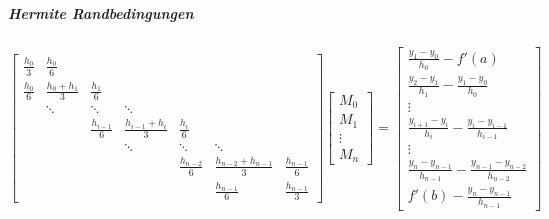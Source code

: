 			\subparagraph{Hermite Randbedingungen}
				\begin{equation*}
					\begin{bmatrix}
						\frac{h_0}{3} & \frac{h_0}{6}       &                                                                                                                   \\
						\frac{h_0}{6} & \frac{h_0 + h_1}{3} & \frac{h_1}{6}       &                                                                                             \\
						              & \ddots              & \ddots              & \ddots                  &                                                                   \\
						              &                     & \frac{h_{i - 1}}{6} & \frac{h_{i-1} + h_i}{3} & \frac{h_i}{6}     &                                               \\
						              &                     &                     & \ddots                  & \ddots            & \ddots                    &                   \\
						              &                     &                     &                         & \frac{h_{n-2}}{6} & \frac{h_{n-2}+h_{n-1}}{3} & \frac{h_{n-1}}{6} \\
						              &                     &                     &                         &                   & \frac{h_{n-1}}{6}         & \frac{h_{n-1}}{3}
					\end{bmatrix}
					\begin{bmatrix}
						M_0    \\
						M_1    \\
						\vdots \\
						M_n
					\end{bmatrix}
					=
					\begin{bmatrix}
						\frac{y_1-y_0}{h_0} - f'(a)                                     \\
						\frac{y_2 - y_1}{h_1} - \frac{y_1 - y_0}{h_0}                   \\
						\vdots                                                          \\
						\frac{y_{i+1} - y_i}{h_i} - \frac{y_i - y_{i-1}}{h_{i-1}}       \\
						\vdots                                                          \\
						\frac{y_n - y_{n-1}}{h_{n-1}} - \frac{y_{n-1}-y_{n-2}}{h_{n-2}} \\
						f'(b) - \frac{y_n-y_{n-1}}{h_{n-1}}
					\end{bmatrix}
				\end{equation*}

